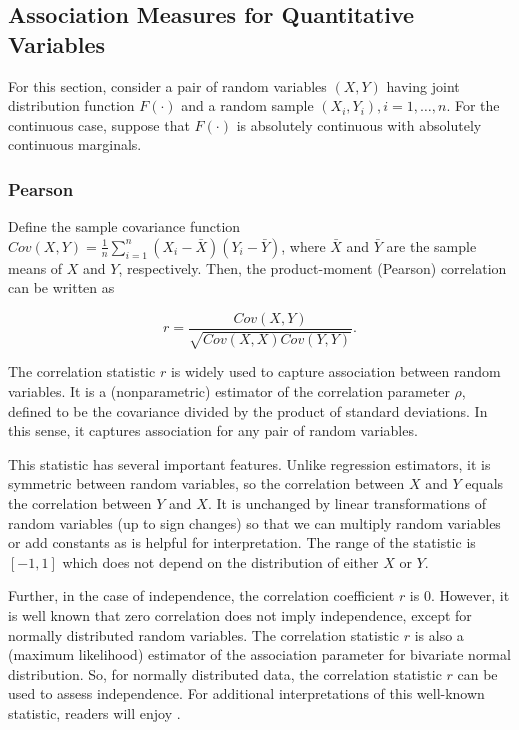 \documentclass[]{book}
\theoremstyle{definition}
\theoremstyle{definition}
\theoremstyle{definition}
\theoremstyle{remark}
\begin{document}
\subsection{Association Measures for Quantitative
Variables}\label{association-measures-for-quantitative-variables}

For this section, consider a pair of random variables \((X,Y)\) having
joint distribution function \(F(\cdot)\) and a random sample
\((X_i,Y_i), i=1, \ldots, n\). For the continuous case, suppose that
\(F(\cdot)\) is absolutely continuous with absolutely continuous
marginals.

\subsubsection{Pearson}\label{pearson}

Define the sample covariance function
\(Cov(X,Y) = \frac{1}{n} \sum_{i=1}^n (X_i - \bar{X})(Y_i - \bar{Y})\),
where \(\bar{X}\) and \(\bar{Y}\) are the sample means of \(X\) and
\(Y\), respectively. Then, the product-moment (Pearson) correlation can
be written as

\begin{equation*}
r = \frac{Cov(X,Y)}{\sqrt{Cov(X,X) Cov(Y,Y)}}.
\end{equation*}

The correlation statistic \(r\) is widely used to capture association
between random variables. It is a (nonparametric) estimator of the
correlation parameter \(\rho\), defined to be the covariance divided by
the product of standard deviations. In this sense, it captures
association for any pair of random variables.

This statistic has several important features. Unlike regression
estimators, it is symmetric between random variables, so the correlation
between \(X\) and \(Y\) equals the correlation between \(Y\) and \(X\).
It is unchanged by linear transformations of random variables (up to
sign changes) so that we can multiply random variables or add constants
as is helpful for interpretation. The range of the statistic is
\([-1,1]\) which does not depend on the distribution of either \(X\) or
\(Y\).

Further, in the case of independence, the correlation coefficient \(r\)
is 0. However, it is well known that zero correlation does not imply
independence, except for normally distributed random variables. The
correlation statistic \(r\) is also a (maximum likelihood) estimator of
the association parameter for bivariate normal distribution. So, for
normally distributed data, the correlation statistic \(r\) can be used
to assess independence. For additional interpretations of this
well-known statistic, readers will enjoy \citep{lee1988thirteen}.
\end{document}
